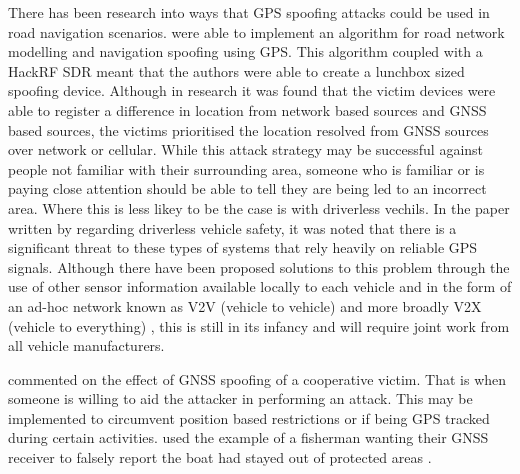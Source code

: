 There has been research into ways that GPS spoofing attacks could be used in road navigation scenarios. \citeauthor{RN9} were able to implement an algorithm for road
network modelling and navigation spoofing using GPS. This algorithm coupled with a HackRF SDR meant that the authors were able to create a lunchbox sized spoofing device.
Although in research it was found that the victim devices were able to register a difference in location from network based sources and GNSS based sources, the victims
prioritised the location resolved from GNSS sources over network or cellular.
While this attack strategy may be successful against people not familiar with their surrounding area, someone who is familiar or is paying close attention should be able
to tell they are being led to an incorrect area. Where this is less likey to be the case is with driverless vechils.
In the paper written by \citeauthor{RN25} \cite{RN25} regarding driverless vehicle safety, it was noted that there is a significant threat to these types
of systems that rely heavily on reliable GPS signals. Although there have been proposed solutions to this problem through the use of 
other sensor information available locally to each vehicle and in the form of an ad-hoc network known as V2V (vehicle to vehicle) and more broadly
V2X (vehicle to everything) \cite{RN17}, this is still in its infancy and will require joint work from all vehicle manufacturers. 

\citeauthor{RN12} commented on the effect of GNSS spoofing of a cooperative victim. That is when someone is willing to aid the attacker
in performing an attack. This may be implemented to circumvent position based restrictions or if being GPS tracked during certain activities.
\citeauthor{RN12} used the example of a fisherman wanting their GNSS receiver to falsely report the boat had stayed out of protected areas \cite{RN12}.

